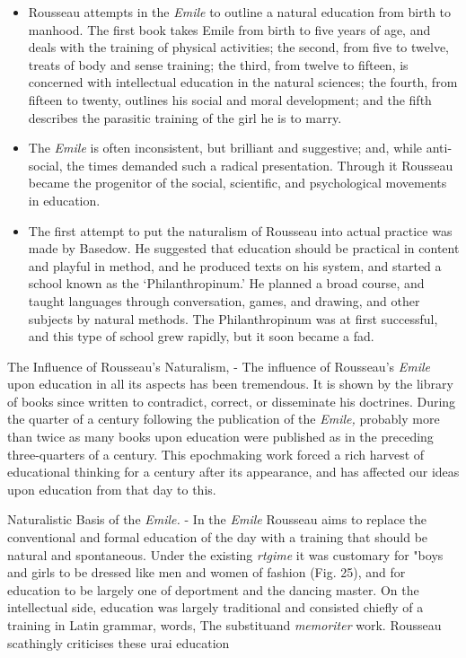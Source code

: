 \documentclass[]{book}
\providecommand{\tightlist}{%
  \setlength{\itemsep}{0pt}\setlength{\parskip}{0pt}}
\begin{document}
\begin{itemize}
\tightlist
\item
  Rousseau attempts in the \emph{Emile} to outline a natural education from birth to manhood. The first book takes Emile from birth to five years of age, and deals with the training of physical activities; the second, from five to twelve, treats of body and sense training; the third, from twelve to fifteen, is concerned with intellectual education in the natural sciences; the fourth, from fifteen to twenty, outlines his social and moral development; and the fifth describes the parasitic training of the girl he is to marry.
\item
  The \emph{Emile} is often inconsistent, but brilliant and suggestive; and, while anti-social, the times demanded such a radical presentation. Through it Rousseau became the progenitor of the social, scientific, and psychological movements in education.
\item
  The first attempt to put the naturalism of Rousseau into actual practice was made by Basedow. He suggested that education should be practical in content and playful in method, and he produced texts on his system, and started a school known as the `Philanthropinum.' He planned a broad course, and taught languages through conversation, games, and drawing, and other subjects by natural methods. The Philanthropinum was at first successful, and this type of school grew rapidly, but it soon became a fad.
\end{itemize}

The Influence of Rousseau's Naturalism, - The influence of Rousseau's \emph{Emile} upon education in all its aspects has been tremendous. It is shown by the library of books since written to contradict, correct, or disseminate his doctrines. During the quarter of a century following the publication of the \emph{Emile,} probably more than twice as many books upon education were published as in the preceding three-quarters of a century. This epochmaking work forced a rich harvest of educational thinking for a century after its appearance, and has affected our ideas upon education from that day to this.

Naturalistic Basis of the \emph{Emile.} - In the \emph{Emile} Rousseau aims to replace the conventional and formal education of the day with a training that should be natural and spontaneous. Under the existing \emph{rtgime} it was customary for "boys and girls to be dressed like men and women of fashion (Fig. 25), and for education to be largely one of deportment and the dancing master. On the intellectual side, education was largely traditional and consisted chiefly of a training in Latin grammar, words, The substituand \emph{memoriter} work. Rousseau scathingly criticises these urai education
\end{document}
